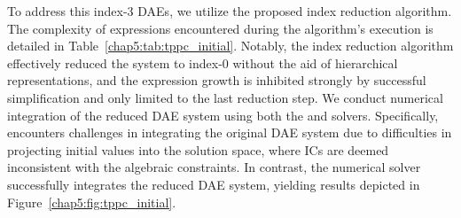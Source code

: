 \begin{table}
  \caption{Expression complexity encountered throughout the index reduction of the initial stage space shuttle reentry problem~\cite{brenan1995numerical} \ac{DAE} system. \emph{Legend}: $\cf$ = functions, $\ca$ = additions, $\cm$ = multiplications, and $\cd$ = divisions.}
  \label{chap5:tab:tppc_initial}
  \centering
  \setlength{\tabcolsep}{0.25em}
\end{table}

To address this index-3 \acp{DAE}, we utilize the proposed index reduction algorithm. The complexity of expressions encountered during the algorithm's execution is detailed in Table~\ref{chap5:tab:tppc_initial}. Notably, the index reduction algorithm effectively reduced the system to index-0 without the aid of hierarchical representations, and the expression growth is inhibited strongly by successful simplification and only limited to the last reduction step. We conduct numerical integration of the reduced \ac{DAE} system using both the \Maple{} and \Indigo{} solvers. Specifically, \Maple{} encounters challenges in integrating the original \ac{DAE} system due to difficulties in projecting initial values into the solution space, where \acp{IC} are deemed inconsistent with the algebraic constraints. In contrast, the \Indigo{} numerical solver successfully integrates the reduced \ac{DAE} system, yielding results depicted in Figure~\ref{chap5:fig:tppc_initial}.

